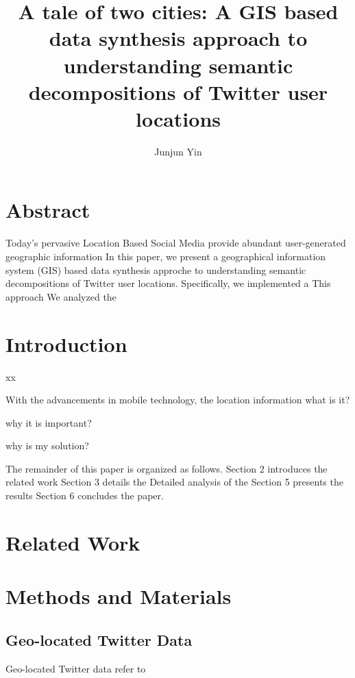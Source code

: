 \documentclass[a4paper, 11pt]{article}
\date{}
\begin{document}
\title{A tale of two cities: A GIS based data synthesis approach to understanding semantic decompositions of Twitter user locations}
\author[1,~\thanks{Corresponding author: jyin@psu.edu}]{Junjun Yin}
\renewcommand\Authands{ and }
\maketitle

\section*{Abstract}
Today's pervasive Location Based Social Media provide abundant user-generated geographic information
In this paper, we present a geographical information system (GIS) based data synthesis approche to understanding semantic decompositions of Twitter user locations.
Specifically, we implemented a
This approach 
We analyzed the 


\section{Introduction}

xx~\citep{yin2016exploring}

With the advancements in mobile technology, the location information 
what is it?

why it is important?

why is my solution?

The remainder of this paper is organized as follows. Section 2 introduces the related work 
Section 3 details the 
Detailed analysis of the
Section 5 presents the results
Section 6 concludes the paper.

\section{Related Work}



\section{Methods and Materials}

\subsection{Geo-located Twitter Data}
Geo-located Twitter data refer to  
\end{document}
